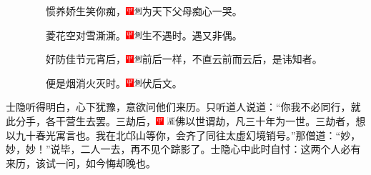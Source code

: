 　　　　惯养娇生笑你痴，{\includegraphics[width=3mm]{../Images/00002}\includegraphics[width=3mm]{../Images/00011}\footnotesize 为天下父母痴心一哭。}

　　　　菱花空对雪澌澌。{\includegraphics[width=3mm]{../Images/00002}\includegraphics[width=3mm]{../Images/00011}\footnotesize 生不遇时。遇又非偶。}

　　　　好防佳节元宵后，{\includegraphics[width=3mm]{../Images/00002}\includegraphics[width=3mm]{../Images/00011}\footnotesize 前后一样，不直云前而云后，是讳知者。}

　　　　便是烟消火灭时。{\includegraphics[width=3mm]{../Images/00002}\includegraphics[width=3mm]{../Images/00011}\footnotesize 伏后文。}

士隐听得明白，心下犹豫，意欲问他们来历。只听道人说道：``你我不必同行，就此分手，各干营生去罢。三劫后，{\includegraphics[width=3mm]{../Images/00002} \includegraphics[width=3mm]{../Images/00010}\footnotesize  佛以世谓劫，凡三十年为一世。三劫者，想以九十春光寓言也。}我在北邙山等你，会齐了同往太虚幻境销号。''那僧道：``妙，妙，妙！''说毕，二人一去，再不见个踪影了。士隐心中此时自忖：这两个人必有来历，该试一问，如今悔却晚也。

